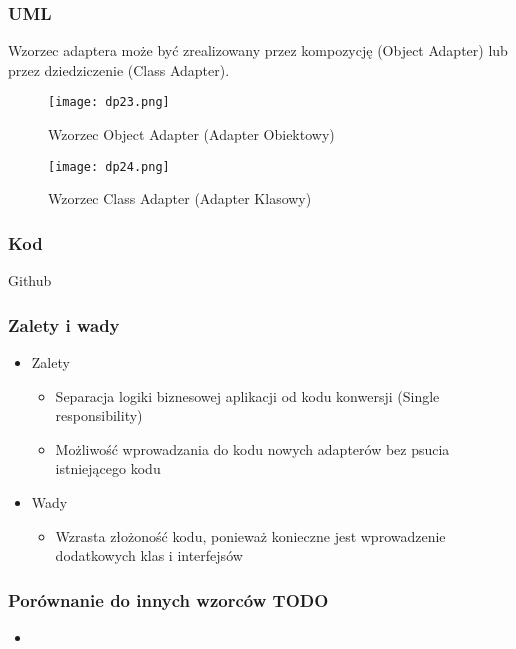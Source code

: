 \documentclass[a4paper,15pt]{article}
\begin{document}
\subsubsection{UML}
Wzorzec adaptera może być zrealizowany przez kompozycję (Object Adapter) lub przez dziedziczenie (Class Adapter).


\begin{figure}[H]
\centering
  \texttt{[image: dp23.png]}
  \caption{Wzorzec Object Adapter (Adapter Obiektowy)}
\end{figure}

\begin{figure}[H]
\centering
  \texttt{[image: dp24.png]}
  \caption{Wzorzec Class Adapter (Adapter Klasowy)}
\end{figure}



\subsubsection{Kod}
Github

\subsubsection{Zalety i wady}


\begin{itemize}
\item Zalety
\begin{itemize}
\item Separacja logiki biznesowej aplikacji od kodu konwersji (Single responsibility)
\item Możliwość wprowadzania do kodu nowych adapterów bez psucia istniejącego kodu
\end{itemize}
\item Wady
\begin{itemize}
\item Wzrasta złożoność kodu, ponieważ konieczne jest wprowadzenie dodatkowych klas i interfejsów
\end{itemize}
\end{itemize}


\subsubsection{Porównanie do innych wzorców TODO}
\begin{itemize}
\item
\end{itemize}
\end{document}
